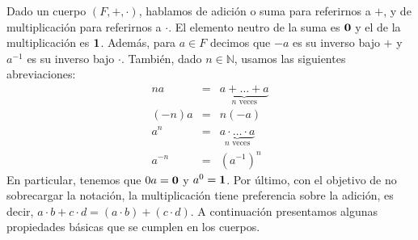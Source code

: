 Dado un cuerpo $(F,+,\cdot)$, hablamos de adición o suma para
referirnos a $+$, y de multiplicación para referirnos a $\cdot$. El
elemento neutro de la suma es $\mathbf{0}$ y el de la multiplicación es
$\mathbf{1}$. Además, para $a\in F$ decimos que $-a$ es su inverso bajo $+$ y
$a^{-1}$ es su inverso bajo $\cdot$.
También, dado $n \in \mathbb{N}$, usamos las siguientes
abreviaciones:
\begin{eqnarray*}
		na & = & \underbrace{a +\ldots + a}_\text{$n$ veces}\\
                (-n)a & = & n(-a)\\
		a^n & = & \underbrace{a \cdot \ldots \cdot a}_\text{$n$ veces}\\
		a^{-n} & = & (a^{-1})^n
\end{eqnarray*}
En particular, tenemos que $0a = \mathbf{0}$ y $a^0 = \mathbf{1}$. Por último, con el
objetivo de no sobrecargar la notación, la multiplicación
tiene preferencia sobre la adición, es decir, $a\cdot b + c\cdot d
= (a\cdot b)+(c\cdot d)$.
A continuación presentamos algunas propiedades básicas que se cumplen
en los cuerpos.


